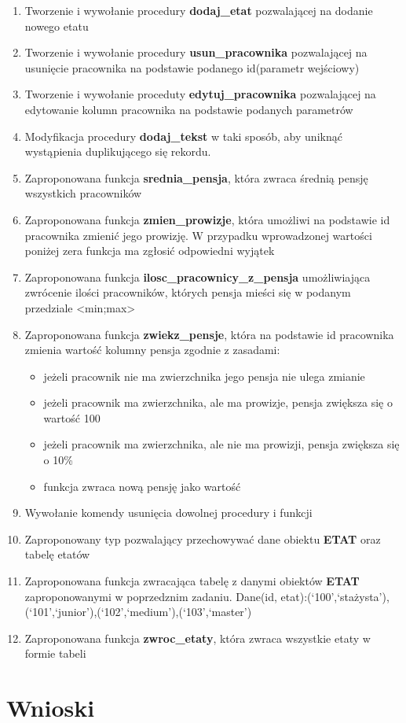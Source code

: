 \documentclass{article}
\begin{document}
\begin{enumerate}
\item Tworzenie i wywołanie procedury \textbf{dodaj\_etat} pozwalającej na dodanie nowego etatu

\item Tworzenie i wywołanie procedury \textbf{usun\_pracownika} pozwalającej na usunięcie pracownika na podstawie podanego id(parametr wejściowy)

\item Tworzenie i wywołanie proceduty \textbf{edytuj\_pracownika} pozwalającej na edytowanie kolumn pracownika na podstawie podanych parametrów

\item Modyfikacja procedury \textbf{dodaj\_tekst} w taki sposób, aby uniknąć wystąpienia duplikującego się rekordu.

\item Zaproponowana funkcja \textbf{srednia\_pensja}, która zwraca średnią pensję wszystkich pracowników

\item Zaproponowana funkcja \textbf{zmien\_prowizje}, która umożliwi na podstawie id pracownika zmienić jego prowizję. W przypadku wprowadzonej wartości poniżej zera funkcja ma zgłosić odpowiedni wyjątek

\item Zaproponowana funkcja \textbf{ilosc\_pracownicy\_z\_pensja} umożliwiająca zwrócenie ilości pracowników, których pensja mieści się w podanym przedziale <min;max>

\item Zaproponowana funkcja \textbf{zwiekz\_pensje}, która na podstawie id pracownika zmienia wartość kolumny pensja zgodnie z zasadami:
\begin{itemize}
\item jeżeli pracownik nie ma zwierzchnika jego pensja nie ulega zmianie
\item jeżeli pracownik ma zwierzchnika, ale ma prowizje, pensja zwiększa się o wartość 100
\item jeżeli pracownik ma zwierzchnika, ale nie ma prowizji, pensja zwiększa się o 10\%
\item funkcja zwraca nową pensję jako wartość
\end{itemize}

\item Wywołanie komendy usunięcia dowolnej procedury i funkcji

\item Zaproponowany typ pozwalający przechowywać dane obiektu \textbf{ETAT} oraz tabelę etatów

\item Zaproponowana funkcja zwracająca tabelę z danymi obiektów \textbf{ETAT} zaproponowanymi w poprzedznim zadaniu. Dane(id, etat):(`100',`stażysta'),(`101',`junior'),(`102',`medium'),(`103',`master')

\item Zaproponowana funkcja \textbf{zwroc\_etaty}, która zwraca wszystkie etaty w formie tabeli
\end{enumerate}

\section{Wnioski}
\end{document}
